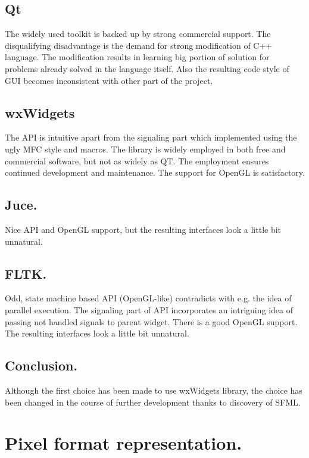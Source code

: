 \subsection{Qt}

The widely used toolkit is backed up by strong commercial support. The disqualifying disadvantage is the demand for strong modification of C++ language. The modification results in learning big portion of solution for problems already solved in the language itself. Also the resulting code style of GUI becomes inconsistent with other part of the project.

\subsection{wxWidgets}

The API is intuitive apart from the signaling part which implemented using the ugly MFC style and macros. The library is widely employed in both free and commercial software, but not as widely as QT. The employment ensures continued development and maintenance. The support for OpenGL is satisfactory.

\subsection{Juce.}
Nice API and OpenGL support, but the resulting interfaces look a little bit unnatural.

\subsection{FLTK.}
Odd, state machine based API (OpenGL-like) contradicts with e.g. the idea of parallel execution. The signaling part of API incorporates an intriguing idea of passing not handled signals to parent widget. There is a good OpenGL support. The resulting interfaces look a little bit unnatural.

\subsection{Conclusion.}
Although the first choice has been made to use wxWidgets library, the choice has been changed in the course of further development thanks to discovery of SFML.

\section{Pixel format representation.}

